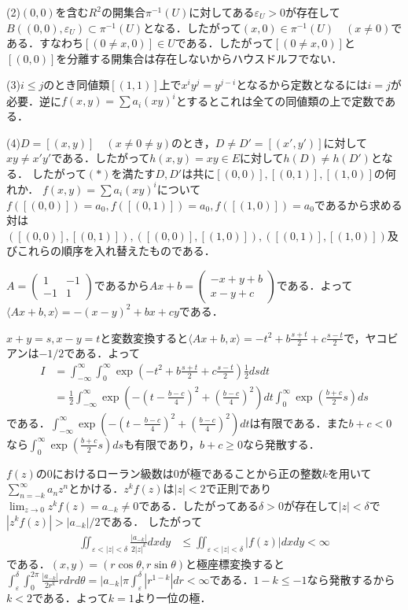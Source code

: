 \documentclass[
		book,
		head_space=20mm,
		foot_space=20mm,
		gutter=10mm,
		line_length=190mm
]{jlreq}
\begin{document}
(2)$(0,0)$を含む$R^2$の開集合$\pi^{-1}(U)$に対してある$\varepsilon_U>0$が存在して
$B((0,0),\varepsilon_U)\subset \pi^{-1}(U)$となる．したがって$(x,0)\in \pi^{-1}(U)\quad(x\neq 0)$である．すなわち$[(0\neq x,0)]\in U$である．したがって$[(0\neq x,0)]$と$[(0,0)]$を分離する開集合は存在しないからハウスドルフでない．

(3)$i\le j$のとき同値類$[(1,1)]$上で$x^iy^j=y^{j-i}$となるから定数となるには$i=j$が必要．逆に$f(x,y)=\sum a_i (xy)^i$とするとこれは全ての同値類の上で定数である．

(4)$D=[(x,y)]\quad(x\neq 0\neq y)$のとき，$D\neq D'=[(x',y')]$に対して$xy\neq x'y'$である．したがって$h(x,y)=xy \in E$に対して$h(D)\neq h(D')$となる．
したがって$(*)$を満たす$D,D'$は共に$[(0,0)],[(0,1)],[(1,0)]$の何れか．
$f(x,y)=\sum a_i (xy)^i$について$f([(0,0)])=a_0,f([(0,1)])=a_0,f([(1,0)])=a_0$であるから求める対は$([(0,0)],[(0,1)]),([(0,0)],[(1,0)]),([(0,1)],[(1,0)])$及びこれらの順序を入れ替えたものである．

$A=\begin{pmatrix}
	1 & -1\\
	-1 & 1
	\end{pmatrix}$であるから$Ax+b=\begin{pmatrix}
		-x+y+b\\
		x-y+c
		\end{pmatrix}$である．よって$\langle Ax+b,x\rangle=-(x-y)^2+bx+cy$である．

$x+y=s,x-y=t$と変数変換すると$\langle Ax+b,x\rangle=-t^2+b\frac{s+t}{2}+c\frac{s-t}{2}$で，ヤコビアンは$-1/2$である．よって
\begin{align}
	I&=\int_{-\infty}^\infty \int_0^\infty \exp(-t^2+b\frac{s+t}{2}+c\frac{s-t}{2})\frac{1}{2}ds dt\\
	&= \frac{1}{2}\int_{-\infty}^\infty \exp(-(t-\frac{b-c}{4})^2+(\frac{b-c}{4})^2)dt \int_0^\infty \exp(\frac{b+c}{2}s)ds
\end{align}
である．$\int_{-\infty}^\infty \exp(-(t-\frac{b-c}{4})^2+(\frac{b-c}{4})^2)dt$は有限である．また$b+c<0$なら$\int_0^\infty \exp(\frac{b+c}{2}s)ds$も有限であり，$b+c\ge 0$なら発散する．

$f(z)$の$0$におけるローラン級数は$0$が極であることから正の整数$k$を用いて$\sum_{n=-k}^\infty a_n z^n$とかける．$z^kf(z)$は$|z|<2$で正則であり$\lim_{z\to 0} z^kf(z)=a_{-k}\neq 0$である．したがってある$\delta>0$が存在して$|z|<\delta$で
$|z^kf(z)|> |a_{-k}|/2$である．
したがって
\begin{align}
	 \iint_{\varepsilon<|z|<\delta} \frac{|a_{-k}|}{2|z|^k}dxdy&\le \iint_{\varepsilon<|z|<\delta} |f(z)|dxdy<\infty 
\end{align}である．$(x,y)=(r\cos \theta,r\sin \theta)$と極座標変換すると
$\int_\varepsilon^\delta \int_0^{2\pi} \frac{|a_{-k}|}{2r^k}rdrd\theta=|a_{-k}|\pi\int_{\varepsilon}^\delta |r^{1-k}|dr<\infty$である．$1-k\le-1$なら発散するから
$k<2$である．よって$k=1$より一位の極．
\end{document}
